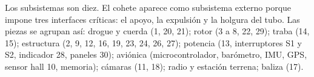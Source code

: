 Los subsistemas son diez. El cohete aparece como subsistema externo porque impone
tres interfaces críticas: el apoyo, la expulsión y la holgura del tubo. Las piezas se agrupan
así: drogue y cuerda (1, 20, 21); rotor (3 a 8, 22, 29); traba (14, 15); estructura (2, 9,
12, 16, 19, 23, 24, 26, 27); potencia (13, interruptores S1 y S2, indicador 28, paneles
30); aviónica (microcontrolador, barómetro, IMU, GPS, sensor hall 10, memoria); cámaras (11,
18); radio y estación terrena; baliza (17).

\newcommand{\plNdiag}[2]{%
  \filldraw[fill=cfijo!18, draw=cfijo!70!black, line width=0.5pt]
    ({#1-0.5},{#1-0.5}) rectangle ({#1+0.5},{#1+0.5});
  \node[font=\scriptsize\bfseries, align=center, text width=1.35cm] at (#1,#1) {#2};}
\newcommand{\plNc}[4]{%
  \ifx M#3\def\plNcol{cfijo}\fi
  \ifx E#3\def\plNcol{cfreno}\fi
  \ifx D#3\def\plNcol{ccont}\fi
  \fill[\plNcol!12] ({#2-0.5},{#1-0.5}) rectangle ({#2+0.5},{#1+0.5});
  \node[font=\scriptsize\bfseries, text=\plNcol!85!black, align=center] at (#2,#1) {#4};}

